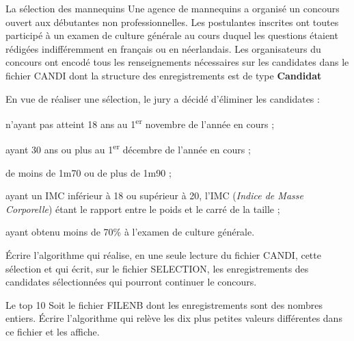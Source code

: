 \begin{Exercice}{La sélection des mannequins}
	Une agence de mannequins a organisé un concours ouvert aux débutantes
	non professionnelles. Les postulantes inscrites ont toutes participé à
	un examen de culture générale au cours duquel les questions étaient
	rédigées indifféremment en français ou en néerlandais. Les
	organisateurs du concours ont encodé tous les renseignements
	nécessaires sur les candidates dans le fichier CANDI dont la structure
	des enregistrements est de type \textbf{Candidat} 
	
	
	En vue de réaliser une sélection, le jury a décidé d’éliminer les
	candidates :

	\begin{liste}
		\item 
			n’ayant pas atteint 18 ans au 1\textsuperscript{er} novembre de l’année
			en cours ;
		\item 
			ayant 30 ans ou plus au 1\textsuperscript{er} décembre de l’année en
			cours ;
		\item 
			de moins de 1m70 ou de plus de 1m90 ;
		\item 
			ayant un IMC inférieur à 18 ou supérieur à 20, l’IMC (\textit{Indice de
			Masse Corporelle}) étant le rapport entre le poids et le carré de la
			taille ;
		\item 
			ayant obtenu moins de 70\% à l’examen de culture générale.
	\end{liste}
	
	Écrire l’algorithme qui réalise, en une seule lecture du fichier CANDI,
	cette sélection et qui écrit, sur le fichier SELECTION, les
	enregistrements des candidates sélectionnées qui pourront continuer le
	concours.
\end{Exercice}

\begin{Exercice}{Le top 10}
	Soit le fichier FILENB dont les enregistrements
	sont des nombres entiers. Écrire l’algorithme qui relève les dix plus
	petites valeurs différentes dans ce fichier et les affiche.
\end{Exercice}

